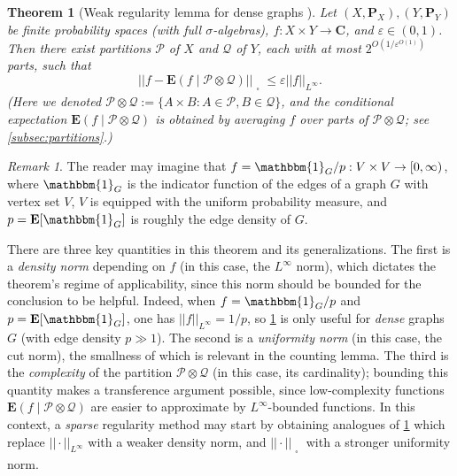 \documentclass[reqno,11pt]{amsart}
\newtheorem{knowntheorem}{Theorem}
\theoremstyle{definition}
\newtheorem{problem}[theorem]{Problem}
\theoremstyle{remark}
\newtheorem*{remark}{Remark}
\numberwithin{equation}{section}
\newcommand{\C}{\mathbf{C}}
\renewcommand{\P}{\mathbf{P}}
\newcommand{\E}{\mathbf{E}}
\newcommand{\mP}{\mathcal{P}}
\newcommand{\mQ}{\mathcal{Q}}
\newcommand{\one}{\mathbbm{1}}
\newcommand{\eps}{\varepsilon}
\newcommand{\sq}{_{\substack{ \\ \square}}}
\begin{document}
\begin{knowntheorem}[Weak regularity lemma for dense graphs \cite{frieze1999quick, lovasz2007szemeredi}] \label{thm:weak-dense-regularity} 
Let $(X, \P_X), (Y, \P_Y)$ be finite probability spaces (with full $\sigma$-algebras), $f : X \times Y \to \C$, and $\eps \in (0, 1)$. Then there exist partitions $\mP$ of $X$ and $\mQ$ of $Y$, each with at most $2^{O(1/\eps^{O(1)})}$ parts, such that
\[
    \left\vert \left\vert f - \E(f \mid \mP \otimes \mQ)
    \right\vert\right\vert\sq \le \eps ||f||_{L^\infty}.
\]
(Here we denoted $\mP \otimes \mQ := \{A \times B : A \in \mP, B \in \mQ\}$, and the conditional expectation $\E(f \mid \mP \otimes \mQ)$ is obtained by averaging $f$ over parts of $\mP \otimes \mQ$; see \cref{subsec:partitions}.)
\end{knowntheorem}

\begin{remark}
The reader may imagine that $f = \one_G/p : V \times V \to [0, \infty)$, where $\one_G$ is the indicator function of the edges of a graph $G$ with vertex set $V$, $V$ is equipped with the uniform probability measure, and $p = \E[\one_G]$ is roughly the edge density of $G$.
\end{remark}


There are three key quantities in this theorem and its generalizations. The first is a \emph{density norm} depending on $f$ (in this case, the $L^\infty$ norm), which dictates the theorem's regime of applicability, since this norm should be bounded for the conclusion to be helpful. Indeed, when $f = \one_{G}/p$ and $p = \E[\one_G]$, one has $||f||_{L^\infty} = 1/p$, so \cref{thm:weak-dense-regularity} is only useful for \emph{dense} graphs $G$ (with edge density $p \gg 1$). The second is a \emph{uniformity norm} (in this case, the cut norm), the smallness of which is relevant in the counting lemma. The third is the \emph{complexity} of the partition $\mP \otimes \mQ$ (in this case, its cardinality); bounding this quantity makes a transference argument possible, since low-complexity functions $\E(f \mid \mP \otimes \mQ)$ are easier to approximate by $L^\infty$-bounded functions. In this context, a \emph{sparse} regularity method may start by obtaining analogues of \cref{thm:weak-dense-regularity} which replace $||\cdot||_{L^\infty}$ with a weaker density norm, and $||\cdot||\sq$ with a stronger uniformity norm.

\end{document}
